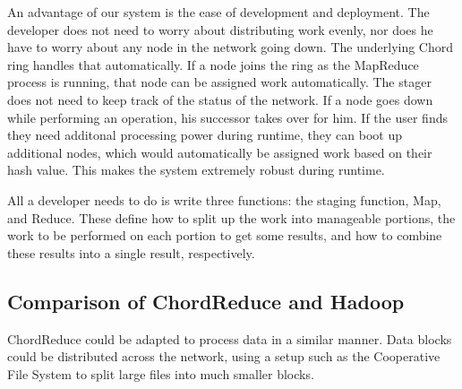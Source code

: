 \documentclass[10pt, conference, compsocconf]{IEEEtran}
\begin{document}
An advantage of our system is the ease of development and deployment.  The developer does not need to worry about distributing work evenly, nor does he have to worry about any node in the network going down.  The underlying Chord ring handles that automatically.  If a node joins the ring as the MapReduce process is running, that node can be assigned work automatically.  The stager does not need to keep track of the status of the network.  If a node goes down while performing an operation, his successor takes over for him.  If the user finds they need additonal processing power during runtime, they can boot up additional nodes, which would automatically be assigned work based on their hash value.  This makes the system extremely robust during runtime.

All a developer needs to do is write three functions: the staging function, Map, and Reduce.  These define how to split up the work into manageable portions, the work to be performed on each portion to get some results, and how to combine these results into a single result, respectively. 


\subsection{Comparison of ChordReduce and Hadoop}


ChordReduce could be adapted to process data in a similar manner.  Data blocks could be distributed across the network, using a setup such as the Cooperative File System \cite{CFS} to split large files into much smaller blocks.  

\end{document}
